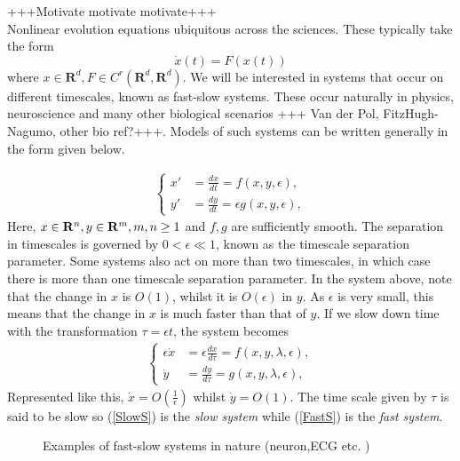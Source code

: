 +++Motivate motivate motivate+++\\
Nonlinear evolution equations ubiquitous across the sciences. These typically take the form
$$ \dot{x}(t) = F\left(x(t)\right)$$ where $x\in \mathbf{R}^d, F\in C^r(\mathbf{R}^d,\mathbf{R}^d)$. We will be interested in systems that occur on different timescales, known as fast-slow systems. These occur naturally in physics, neuroscience and many other biological scenarios +++ Van der Pol, FitzHugh-Nagumo, other bio ref?+++. Models of such systems can be written generally in the form given below.

\begin{align}
\begin{cases}
x' &=\frac{dx}{dt}= f(x,y,\epsilon),\\
y' &= \frac{dy}{dt}= \epsilon g(x,y,  \epsilon),
\end{cases}\label{FastS}
\end{align} 
Here, $x \in \mathbf{R}^n, y \in \mathbf{R}^m, m,n \geq 1$ and $f,g$ are sufficiently smooth. The separation in timescales is governed by $0<\epsilon \ll 1$, known as the timescale separation parameter. Some systems also act on more than two timescales, in which case there is more than one timescale separation parameter.  In the system above, note that the change in $x$ is $O(1)$, whilst it is $O(\epsilon)$ in $y$. As $\epsilon$ is very small, this means that the change in $x$ is much faster than that of $y$. If we slow down time with the transformation $\tau = \epsilon t$, the system becomes  
\begin{align}
	\begin{cases}
	\epsilon \dot{x} &= \epsilon \frac{dx}{d\tau} = f(x,y,\lambda, \epsilon),\\
	\dot{y} & = \frac{dy}{d \tau} =  g( x,y, \lambda, \epsilon),
	\end{cases}\label{SlowS}
\end{align} 
Represented like this, $\dot{x} = O(\frac{1}{\epsilon})$ whilst $\dot{y} = O(1)$.  The time scale given by $\tau$ is said to be slow so (\ref{SlowS}) is the \emph{slow system} while (\ref{FastS}) is the \emph{fast system}.\\


\begin{figure}[h]
	\caption{Examples of fast-slow systems in nature (neuron,ECG etc. )}
	\label{fig:nature}
\end{figure} 


